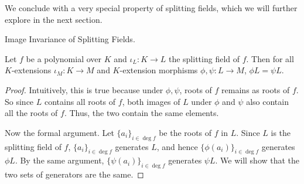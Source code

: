 \documentclass[../book.tex]{subfiles}
\begin{document}
\begin{rmk}
    We conclude with a very special property of splitting fields,
    which we will further explore in the next section. 
\end{rmk}
\begin{thm} Image Invariance of Splitting Fields. 
    
    Let $f$ be a polynomial over $K$ and 
    $\iota_L : K \to L$ the splitting field of $f$.
    Then for all $K$-extensions $\iota_M : K \to M$ and
    $K$-extension morphisms $\phi, \psi : L \to M$, $\phi L = \psi L$. 
\end{thm}
\begin{proof}
    Intuitively, this is true because under $\phi,\psi$,
    roots of $f$ remains as roots of $f$. 
    So since $L$ contains all roots of $f$, 
    both images of $L$ under $\phi$ and $\psi$ also contain all the roots of $f$.
    Thus, the two contain the same elements. 
    
    Now the formal argument. 
    Let $\{a_i\}_{i\in\deg f}$ be the roots of $f$ in $L$. 
    Since $L$ is the splitting field of $f$, $\{a_i\}_{i\in\deg f}$ generates $L$,
    and hence $\{\phi(a_i)\}_{i\in\deg f}$ generates $\phi L$. 
    By the same argument, $\{\psi(a_i)\}_{i\in\deg f}$ generates $\psi L$. 
    We will show that the two sets of generators are the same.
    

\end{proof}
\end{document}
